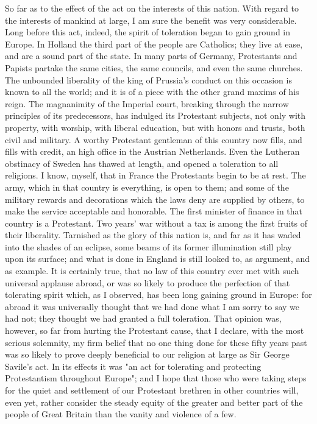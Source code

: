 So far as to the effect of the act on the interests of this nation. With regard to the interests of mankind at large, I am sure the benefit was very considerable. Long before this act, indeed, the spirit of toleration began to gain ground in Europe. In Holland the third part of the people are Catholics; they live at ease, and are a sound part of the state. In many parts of Germany, Protestants and Papists partake the same cities, the same councils, and even the same churches. The unbounded liberality of the king of Prussia's conduct on this occasion is known to all the world; and it is of a piece with the other grand maxims of his reign. The magnanimity of the Imperial court, breaking through the narrow principles of its predecessors, has indulged its Protestant subjects, not only with property, with worship, with liberal education, but with honors and trusts, both civil and military. A worthy Protestant gentleman of this country now fills, and fills with credit, an high office in the Austrian Netherlands. Even the Lutheran obstinacy of Sweden has thawed at length, and opened a toleration to all religions. I know, myself, that in France the Protestants begin to be at rest. The army, which in that country is everything, is open to them; and some of the military rewards and decorations which the laws deny are supplied by others, to make the service acceptable and honorable. The first minister of finance in that country is a Protestant. Two years' war without a tax is among the first fruits of their liberality. Tarnished as the glory of this nation is, and far as it has waded into the shades of an eclipse, some beams of its former illumination still play upon its surface; and what is done in England is still looked to, as argument, and as example. It is certainly true, that no law of this country ever met with such universal applause abroad, or was so likely to produce the perfection of that tolerating spirit which, as I observed, has been long gaining ground in Europe: for abroad it was universally thought that we had done what I am sorry to say we had not; they thought we had granted a full toleration. That opinion was, however, so far from hurting the Protestant cause, that I declare, with the most serious solemnity, my firm belief that no one thing done for these fifty years past was so likely to prove deeply beneficial to our religion at large as Sir George Savile's act. In its effects it was "an act for tolerating and protecting Protestantism throughout Europe"; and I hope that those who were taking steps for the quiet and settlement of our Protestant brethren in other countries will, even yet, rather consider the steady equity of the greater and better part of the people of Great Britain than the vanity and violence of a few.

